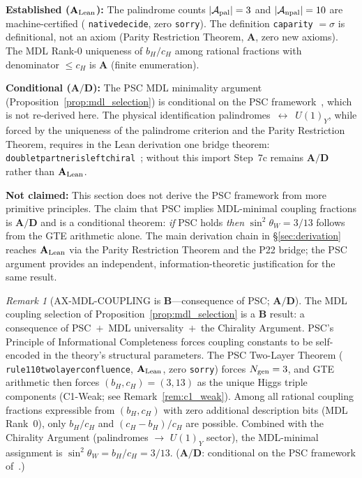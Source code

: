 \documentclass[11pt]{article}
\theoremstyle{remark}
\newtheorem{remark}[theorem]{Remark}
\newcommand{\Ngen}{N_{\rm gen}}
\newcommand{\bH}{b_H}
\newcommand{\cH}{c_H}
\newcommand{\lean}[1]{%
  \penalty-100
  \begingroup\def\_{\textunderscore\allowbreak}\texttt{#1}\endgroup}
\newcommand{\sinwsq}{\sin^2\!\theta_W}
\newcommand{\CatA}{\textbf{A}}
\newcommand{\CatAL}{\ensuremath{\textbf{A}_{\rm Lean}}}
\newcommand{\CatAD}{\textbf{A/D}}
\newcommand{\CatB}{\textbf{B}}
\begin{document}
\begin{tcolorbox}[colback=orange!4,colframe=orange!55!black,
  title={\textbf{What this section does and does not claim}},
  fonttitle=\bfseries,left=6pt,right=6pt,top=5pt,bottom=5pt]
\small
\textbf{Established ($\CatAL$):}
The palindrome counts $|\mathcal{A}_{\rm pal}| = 3$ and $|\mathcal{A}_{\rm npal}| = 10$
are machine-certified (\lean{native\_decide}, zero \texttt{sorry}).
The definition \lean{ca\_parity} $= \sigma$ is definitional, not an axiom
(Parity Restriction Theorem, $\CatA$, zero new axioms).
The MDL Rank-0 uniqueness of $\bH/\cH$ among rational fractions with denominator
$\leq \cH$ is $\CatA$ (finite enumeration).

\textbf{Conditional ($\CatAD$):}
The PSC MDL minimality argument (Proposition~\ref{prop:mdl_selection}) is conditional
on the PSC framework~\cite{Spivack2025_UGPUniqueness}, which is not re-derived here.
The physical identification palindromes~$\leftrightarrow$~$U(1)_Y$, while forced by
the uniqueness of the palindrome criterion and the Parity Restriction Theorem, requires
in the Lean derivation one bridge theorem:
\lean{doublet\_partner\_is\_left\_chiral}~\cite{Spivack2026_UGPDynamics};
without this import Step~7c remains $\CatAD$ rather than $\CatAL$.

\textbf{Not claimed:}
This section does not derive the PSC framework from more primitive principles.
The claim that PSC implies MDL-minimal coupling fractions is $\CatAD$ and is
a conditional theorem: \emph{if} PSC holds \emph{then} $\sinwsq = 3/13$ follows from
the GTE arithmetic alone.
The main derivation chain in \S\ref{sec:derivation} reaches $\CatAL$ via the
Parity Restriction Theorem and the P22 bridge; the PSC argument provides an
independent, information-theoretic justification for the same result.
\end{tcolorbox}

\begin{remark}[AX-MDL-COUPLING is $\CatB$---consequence of PSC; $\CatAD$]
\label{rem:ax_mdl_coupling_catb}
The MDL coupling selection of Proposition~\ref{prop:mdl_selection} is a $\CatB$
result: a consequence of PSC~$+$~MDL universality~$+$~the Chirality Argument.
PSC's Principle of Informational Completeness forces coupling constants to be
self-encoded in the theory's structural parameters.
The PSC Two-Layer Theorem (\lean{rule110\_two\_layer\_confluence}, $\CatAL$, zero
\texttt{sorry}) forces $\Ngen = 3$, and GTE arithmetic then forces
$(\bH, \cH) = (3, 13)$ as the unique Higgs triple components
(C1-Weak; see Remark~\ref{rem:c1_weak}).
Among all rational coupling fractions expressible from $(\bH, \cH)$ with zero
additional description bits (MDL Rank~0), only $\bH/\cH$ and $(\cH-\bH)/\cH$
are possible.
Combined with the Chirality Argument (palindromes $\to$ $U(1)_Y$ sector), the
MDL-minimal assignment is $\sinwsq = \bH/\cH = 3/13$.
($\CatAD$: conditional on the PSC framework of~\cite{Spivack2025_UGPUniqueness}.)
\end{remark}
\end{document}
